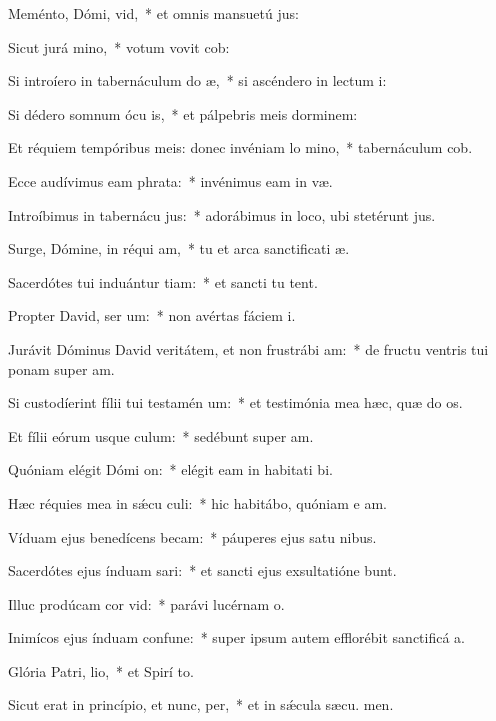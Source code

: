 \item Meménto, Dómi, vid,~* et omnis mansuetú jus:
\item Sicut jurá mino,~* votum vovit  cob:
\item Si introíero in tabernáculum do æ,~* si ascéndero in lectum  i:
\item Si dédero somnum ócu is,~* et pálpebris meis dorminem:
\item Et réquiem tempóribus meis: donec invéniam lo mino,~* tabernáculum  cob.
\item Ecce audívimus eam  phrata:~* invénimus eam in  væ.
\item Introíbimus in tabernácu jus:~* adorábimus in loco, ubi stetérunt  jus.
\item Surge, Dómine, in réqui am,~* tu et arca sanctificati æ.
\item Sacerdótes tui induántur tiam:~* et sancti tu tent.
\item Propter David, ser um:~* non avértas fáciem  i.
\item Jurávit Dóminus David veritátem, et non frustrábi am:~* de fructu ventris tui ponam super  am.
\item Si custodíerint fílii tui testamén um:~* et testimónia mea hæc, quæ do os.
\item Et fílii eórum usque  culum:~* sedébunt super  am.
\item Quóniam elégit Dómi on:~* elégit eam in habitati bi.
\item Hæc réquies mea in sǽcu culi:~* hic habitábo, quóniam e am.
\item Víduam ejus benedícens becam:~* páuperes ejus satu nibus.
\item Sacerdótes ejus índuam sari:~* et sancti ejus exsultatióne bunt.
\item Illuc prodúcam cor vid:~* parávi lucérnam  o.
\item Inimícos ejus índuam confune:~* super ipsum autem efflorébit sanctificá a.
\item Glória Patri,  lio,~* et Spirí to.
\item Sicut erat in princípio, et nunc,  per,~* et in sǽcula sæcu. men.
